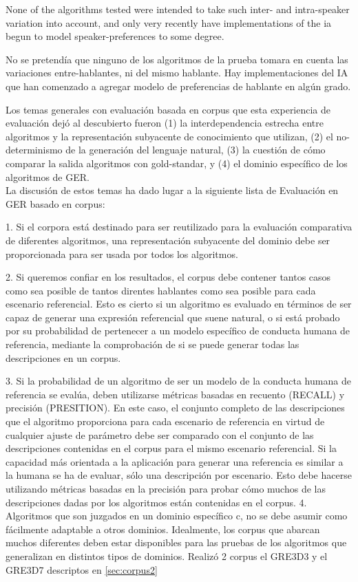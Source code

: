 None of the algorithms tested were intended to take such inter- and
intra-speaker variation into account, and only very recently have implementations
of the
ia
begun to model speaker-preferences to some degree.

No se pretend\'ia que ninguno de los algoritmos de la prueba tomara en cuenta las variaciones entre-hablantes, ni del mismo hablante. Hay implementaciones del IA que han comenzado a agregar modelo de preferencias de hablante en alg\'un grado.

Los temas generales con evaluaci\'on basada en corpus que esta experiencia de evaluaci\'on dej\'o
al descubierto fueron (1) la interdependencia estrecha entre algoritmos y la
representaci\'on subyacente de conocimiento que utilizan, (2) el no-determinismo de la generaci\'on del lenguaje natural, (3) la cuesti\'on de c\'omo comparar la salida algoritmos con gold-standar, y (4) el dominio espec\'ifico de los algoritmos de GER.\\
La discusi\'on de estos temas ha dado lugar a la siguiente lista de Evaluaci\'on en GER basado en corpus:

1. Si el corpora est\'a destinado para ser reutilizado para la evaluaci\'on comparativa de diferentes
algoritmos, una representaci\'on subyacente del dominio debe ser proporcionada para ser usada por todos los algoritmos.

2. Si queremos confiar en los resultados, el corpus debe contener tantos casos como sea posible de tantos direntes hablantes como sea posible para cada escenario referencial. 
Esto es cierto si un algoritmo es evaluado en t\'erminos de ser capaz de generar una expresi\'on referencial que suene natural, o si est\'a probado por su probabilidad de pertenecer a un modelo espec\'ifico de conducta humana de referencia, mediante la comprobaci\'on de si se puede generar todas las descripciones en un corpus.

3. Si la probabilidad de un algoritmo de ser un modelo de la conducta humana de referencia
se eval\'ua, deben utilizarse m\'etricas basadas en recuento (RECALL) y precisi\'on (PRESITION). En este
caso, el conjunto completo de las descripciones que el algoritmo proporciona para cada
escenario de referencia en virtud de cualquier ajuste de par\'ametro debe ser comparado con el
conjunto de las descripciones contenidas en el corpus para el mismo escenario referencial.
Si la capacidad m\'as orientada a la aplicaci\'on para generar una referencia es similar a la humana
se ha de evaluar, s\'olo una descripci\'on por escenario.
Esto debe hacerse utilizando m\'etricas basadas en la precisi\'on para probar c\'omo muchos de las
descripciones dadas por los algoritmos est\'an contenidas en el corpus.
4. Algoritmos que son juzgados en un dominio espec\'ifico c, no se debe asumir como
f\'acilmente adaptable a otros dominios. Idealmente, los corpus que abarcan muchos diferentes
deben estar disponibles para las pruebas de los algoritmos que generalizan en distintos tipos de dominios.
Realiz\'o 2 corpus el GRE3D3 y el GRE3D7 descriptos en \ref{sec:corpus2}

